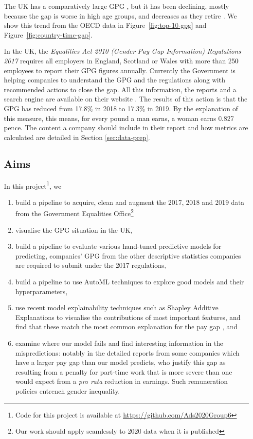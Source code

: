 The UK has a comparatively large GPG \cite{ONS2018}, but it has been declining, mostly because the gap is worse in high age groups, and decreases as they retire \cite{brynin2017gender}. We show this trend from the OECD data in Figure\ \ref{fig:top-10-gpg} and Figure\ \ref{fig:country-time-gap}. 

In the UK, the \emph{Equalities Act 2010 (Gender Pay Gap Information) Regulations 2017} \cite{equality-act-gpg-regulations} requires all  employers in England, Scotland or Wales with more than 250 employees to report their GPG figures annually.
Currently the Government is helping companies to understand the GPG and the regulations along with recommended actions to close the gap. All this information, the reports and a search engine are available on their website \cite{govuk-gender-pay-gap-service}. The results of this action is that the GPG has reduced from 17.8\% in 2018 to 17.3\% in 2019. By the explanation of this measure, this means, for every pound a man earns, a woman earns 0.827 pence. The content a company should include in their report and how metrics are calculated are detailed in Section \ref{sec:data-prep}.

\subsection{Aims}
In this project\footnote{Code for this project is available at \url{https://github.com/Ads2020Group6}}, we 

\begin{enumerate}
\item build a pipeline to acquire, clean and augment the 2017, 2018 and 2019 data from the Government Equalities Office\footnote{Our work should apply seamlessly to 2020 data when it is published}
\item visualise the GPG situation in the UK,
\item build a pipeline to evaluate various hand-tuned predictive models for predicting,
companies' GPG from the other descriptive statistics companies are required to submit under the 2017 regulations,
\item build a pipeline to use AutoML techniques \cite{tpot-automl} to explore good models and their hyperparameters,
\item use recent model explainability techniques such as Shapley 
Additive Explanations \cite{Lundberg2017} to visualise the contributions of most important features, and find that these match the most common explanation for the pay gap \cite{gov-equalities-office-research-report}, and
\item examine where our model fails and find interesting information in the mispredictions: notably in the detailed reports from some companies which have a larger pay gap than our model predicts, who justify this gap as resulting from a penalty for part-time work that is more severe than one would expect from a \emph{pro rata} reduction in earnings. Such remuneration policies entrench gender inequality.

    
    
\end{enumerate}
